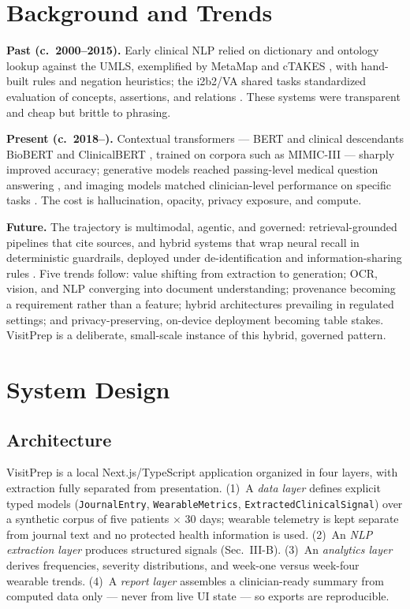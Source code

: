 \documentclass[10pt,twocolumn]{article}
\begin{document}
\section{Background and Trends}
\textbf{Past (c.\ 2000--2015).} Early clinical NLP relied on dictionary and ontology lookup against the UMLS, exemplified by MetaMap \cite{metamap} and cTAKES \cite{ctakes}, with hand-built rules and negation heuristics; the i2b2/VA shared tasks standardized evaluation of concepts, assertions, and relations \cite{i2b2}. These systems were transparent and cheap but brittle to phrasing.

\textbf{Present (c.\ 2018--).} Contextual transformers --- BERT \cite{bert} and clinical descendants BioBERT \cite{biobert} and ClinicalBERT \cite{clinicalbert}, trained on corpora such as MIMIC-III \cite{mimic} --- sharply improved accuracy; generative models reached passing-level medical question answering \cite{medpalm}, and imaging models matched clinician-level performance on specific tasks \cite{chexnet}. The cost is hallucination, opacity, privacy exposure, and compute.

\textbf{Future.} The trajectory is multimodal, agentic, and governed: retrieval-grounded pipelines that cite sources, and hybrid systems that wrap neural recall in deterministic guardrails, deployed under de-identification and information-sharing rules \cite{hipaa,cures}. Five trends follow: value shifting from extraction to generation; OCR, vision, and NLP converging into document understanding; provenance becoming a requirement rather than a feature; hybrid architectures prevailing in regulated settings; and privacy-preserving, on-device deployment becoming table stakes. VisitPrep is a deliberate, small-scale instance of this hybrid, governed pattern.

\section{System Design}
\subsection{Architecture}
VisitPrep is a local Next.js/TypeScript application organized in four layers, with extraction fully separated from presentation. (1)~A \emph{data layer} defines explicit typed models (\texttt{JournalEntry}, \texttt{WearableMetrics}, \texttt{ExtractedClinicalSignal}) over a synthetic corpus of five patients $\times$ 30 days; wearable telemetry is kept separate from journal text and no protected health information is used. (2)~An \emph{NLP extraction layer} produces structured signals (Sec.~III-B). (3)~An \emph{analytics layer} derives frequencies, severity distributions, and week-one versus week-four wearable trends. (4)~A \emph{report layer} assembles a clinician-ready summary from computed data only --- never from live UI state --- so exports are reproducible.
\end{document}
